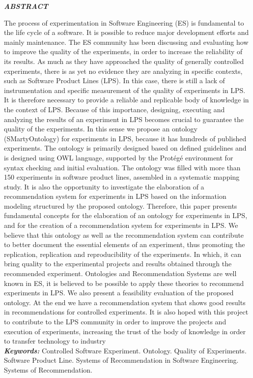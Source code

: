\clearpage
\thispagestyle{empty}

\noindent{\large\bf\dadoTituloAbs}
\noindent{\large\dadoSubTituloAbs}

\normalsize
\begin{center}	
	\vspace*{0.5cm}
	\textbf{\textit{ABSTRACT}}
\end{center}

The process of experimentation in Software Engineering (ES) is fundamental to the life cycle of a software. It is possible to reduce major development efforts and mainly maintenance. The ES community has been discussing and evaluating how to improve the quality of the experiments, in order to increase the reliability of its results. As much as they have approached the quality of generally controlled experiments, there is as yet no evidence they are analyzing in specific contexts, such as Software Product Lines (LPS). In this case, there is still a lack of instrumentation and specific measurement of the quality of experiments in LPS. It is therefore necessary to provide a reliable and replicable body of knowledge in the context of LPS. Because of this importance, designing, executing and analyzing the results of an experiment in LPS becomes crucial to guarantee the quality of the experiments. In this sense we propose an ontology (SMartyOntology) for experiments in LPS, because it has hundreds of published experiments. The ontology is primarily designed based on defined guidelines and is designed using OWL language, supported by the Protégé environment for syntax checking and initial evaluation. The ontology was filled with more than 150 experiments in software product lines, assembled in a systematic mapping study. It is also the opportunity to investigate the elaboration of a recommendation system for experiments in LPS based on the information modeling structured by the proposed ontology. Therefore, this paper presents fundamental concepts for the elaboration of an ontology for experiments in LPS, and for the creation of a recommendation system for experiments in LPS. We believe that this ontology as well as the recommendation system can contribute to better document the essential elements of an experiment, thus promoting the replication, replication and reproducibility of the experiments. In which, it can bring quality to the experimental projects and results obtained through the recommended experiment. Ontologies and Recommendation Systems are well known in ES, it is believed to be possible to apply these theories to recommend experiments in LPS. We also present a feasibility evaluation of the proposed ontology. At the end we have a recommendation system that shows good results in recommendations for controlled experiments. It is also hoped with this project to contribute to the LPS community in order to improve the projects and execution of experiments, increasing the trust of the body of knowledge in order to transfer technology to industry\\

\noindent \textbf{\textit{Keywords:}} Controlled Software Experiment. Ontology. Quality of Experiments. Software Product Line. Systems of Recommendation in Software Engineering. Systems of Recommendation.

\pagebreak

 

